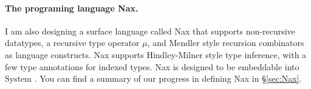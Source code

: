 \paragraph{The programing language Nax.}
I am also designing a surface language called Nax that supports
non-recursive datatypes, a recursive type operator $\mu$, and
Mendler style recursion combinators as language constructs.
Nax supports Hindley-Milner style type inference, with a few type annotations
for indexed types. Nax is designed to be embeddable into System \Fi.
You can find a summary of our progress in defining Nax in \S\ref{sec:Nax}.

